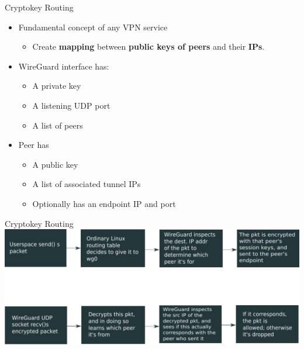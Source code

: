 \documentclass{beamer}
\begin{document}
    \begin{frame}{Cryptokey Routing}
        \begin{itemize}
            \item Fundamental concept of any VPN service
                \begin{itemize}
                    \item Create \textbf{mapping} between \textbf{public keys of peers} and their \textbf{IPs}.
                \end{itemize}
            \item WireGuard interface has:
                \begin{itemize}
                    \item A private key
                    \item A listening UDP port
                    \item A list of peers
                \end{itemize}
            \item Peer has
                \begin{itemize}
                    \item A public key
                    \item A list of associated tunnel IPs
                    \item Optionally has an endpoint IP and port
                \end{itemize}
        \end{itemize}
    \end{frame}
    \begin{frame}[fragile]{Cryptokey Routing}
        \includegraphics[width=\textwidth]{crypto_route.pdf}
    \end{frame}
\end{document}
